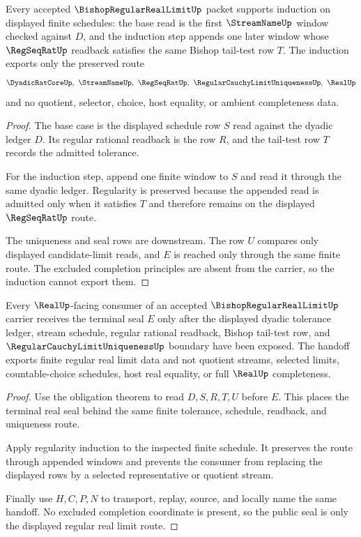 \begin{theorem}
\label{thm:bishop-regular-real-limit-regularity-induction}
Every accepted $\BishopRegularRealLimitUp$ packet supports induction on displayed finite schedules: the base read is the first $\StreamNameUp$ window checked against $D$, and the induction step appends one later window whose $\RegSeqRatUp$ readback satisfies the same Bishop tail-test row $T$. The induction exports only the preserved route
$$
\DyadicRatCoreUp,\ \StreamNameUp,\ \RegSeqRatUp,\ \RegularCauchyLimitUniquenessUp,\ \RealUp
$$
and no quotient, selector, choice, host equality, or ambient completeness data.
\end{theorem}
\begin{proof}
The base case is the displayed schedule row $S$ read against the dyadic ledger $D$. Its regular rational readback is the row $R$, and the tail-test row $T$ records the admitted tolerance.

For the induction step, append one finite window to $S$ and read it through the same dyadic ledger. Regularity is preserved because the appended read is admitted only when it satisfies $T$ and therefore remains on the displayed $\RegSeqRatUp$ route.

The uniqueness and seal rows are downstream. The row $U$ compares only displayed candidate-limit reads, and $E$ is reached only through the same finite route. The excluded completion principles are absent from the carrier, so the induction cannot export them.
\end{proof}

\begin{theorem}
\label{thm:bishop-regular-real-limit-seal-handoff}
Every $\RealUp$-facing consumer of an accepted $\BishopRegularRealLimitUp$ carrier receives the terminal seal $E$ only after the displayed dyadic tolerance ledger, stream schedule, regular rational readback, Bishop tail-test row, and $\RegularCauchyLimitUniquenessUp$ boundary have been exposed. The handoff exports finite regular real limit data and not quotient streams, selected limits, countable-choice schedules, host real equality, or full $\RealUp$ completeness.
\end{theorem}
\begin{proof}
Use the obligation theorem to read $D,S,R,T,U$ before $E$. This places the terminal real seal behind the same finite tolerance, schedule, readback, and uniqueness route.

Apply regularity induction to the inspected finite schedule. It preserves the route through appended windows and prevents the consumer from replacing the displayed rows by a selected representative or quotient stream.

Finally use $H,C,P,N$ to transport, replay, source, and locally name the same handoff. No excluded completion coordinate is present, so the public seal is only the displayed regular real limit route.
\end{proof}

